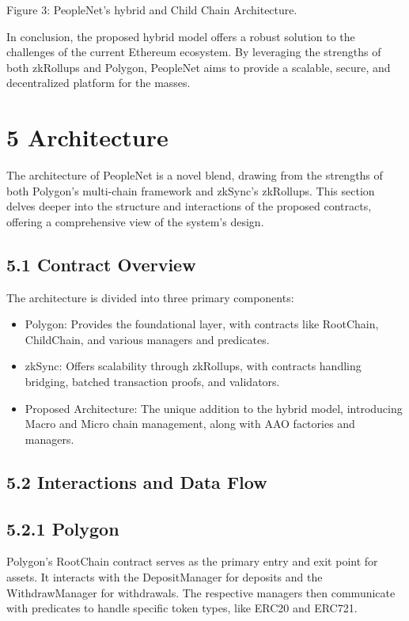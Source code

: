 \documentclass[10pt]{article}
\begin{document}
Figure 3: PeopleNet's hybrid and Child Chain Architecture.

In conclusion, the proposed hybrid model offers a robust solution to the challenges of the current Ethereum ecosystem. By leveraging the strengths of both zkRollups and Polygon, PeopleNet aims to provide a scalable, secure, and decentralized platform for the masses.

\section*{5 Architecture}
The architecture of PeopleNet is a novel blend, drawing from the strengths of both Polygon's multi-chain framework and zkSync's zkRollups. This section delves deeper into the structure and interactions of the proposed contracts, offering a comprehensive view of the system's design.

\subsection*{5.1 Contract Overview}
The architecture is divided into three primary components:

\begin{itemize}
  \item Polygon: Provides the foundational layer, with contracts like RootChain, ChildChain, and various managers and predicates.
  \item zkSync: Offers scalability through zkRollups, with contracts handling bridging, batched transaction proofs, and validators.
  \item Proposed Architecture: The unique addition to the hybrid model, introducing Macro and Micro chain management, along with AAO factories and managers.
\end{itemize}

\subsection*{5.2 Interactions and Data Flow}
\subsection*{5.2.1 Polygon}
Polygon's RootChain contract serves as the primary entry and exit point for assets. It interacts with the DepositManager for deposits and the WithdrawManager for withdrawals. The respective managers then communicate with predicates to handle specific token types, like ERC20 and ERC721.
\end{document}
